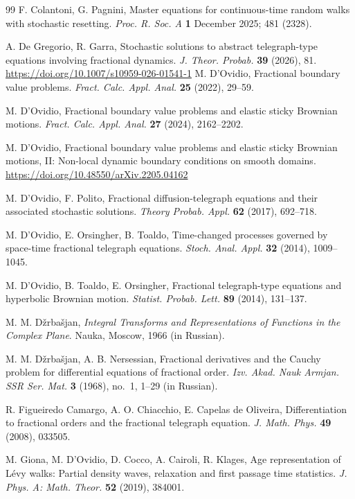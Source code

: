 \documentclass[10pt,a4paper]{article}
\numberwithin{equation}{section}
\theoremstyle{plain}
\theoremstyle{remark}
\begin{document}
\begin{thebibliography}{99}
F. Colantoni, G. Pagnini, 
Master equations for continuous-time random walks with stochastic resetting. 
\textit{Proc. R. Soc. A} \textbf{1} December 2025; 481 (2328).

A. De Gregorio, R. Garra, Stochastic solutions to abstract telegraph-type equations involving fractional dynamics. \textit{J. Theor. Probab.} \textbf{39} (2026), 81. \url{https://doi.org/10.1007/s10959-026-01541-1}
M. D'Ovidio,
Fractional boundary value problems.
\textit{Fract. Calc. Appl. Anal.} \textbf{25} (2022), 29--59.

M. D'Ovidio,
Fractional boundary value problems and elastic sticky Brownian motions.
\textit{Fract. Calc. Appl. Anal.} \textbf{27} (2024), 2162--2202.

M. D'Ovidio,
Fractional boundary value problems and elastic sticky Brownian motions, II:
Non-local dynamic boundary conditions on smooth domains.
\url{https://doi.org/10.48550/arXiv.2205.04162}

M. D'Ovidio, F. Polito,
Fractional diffusion-telegraph equations and their associated stochastic solutions.
\textit{Theory Probab. Appl.} \textbf{62} (2017), 692--718.

M. D'Ovidio, E. Orsingher, B. Toaldo,
Time-changed processes governed by space-time fractional telegraph equations.
\textit{Stoch. Anal. Appl.} \textbf{32} (2014), 1009--1045.

M. D'Ovidio, B. Toaldo, E. Orsingher,
Fractional telegraph-type equations and hyperbolic Brownian motion.
\textit{Statist. Probab. Lett.} \textbf{89} (2014), 131--137.

M. M. D\v{z}rba\v{s}jan,
\textit{Integral Transforms and Representations of Functions in the Complex Plane}.
Nauka, Moscow, 1966 (in Russian).

M. M. D\v{z}rba\v{s}jan, A. B. Nersessian,
Fractional derivatives and the Cauchy problem for differential equations of fractional order.
\textit{Izv. Akad. Nauk Armjan. SSR Ser. Mat.} \textbf{3} (1968), no.~1, 1--29
(in Russian).

R. Figueiredo Camargo, A. O. Chiacchio, E. Capelas de Oliveira,
Differentiation to fractional orders and the fractional telegraph equation.
\textit{J. Math. Phys.} \textbf{49} (2008), 033505.

M. Giona, M. D'Ovidio, D. Cocco, A. Cairoli, R. Klages,
Age representation of L\'evy walks: Partial density waves, relaxation and first passage time statistics.
\textit{J. Phys. A: Math. Theor.} \textbf{52} (2019), 384001.


\end{thebibliography}
\end{document}
